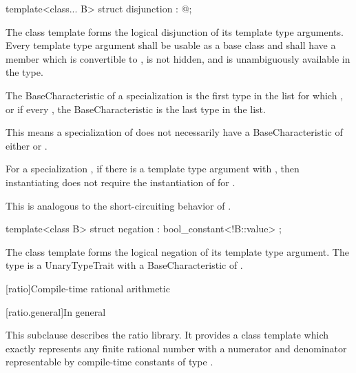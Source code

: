 %
\begin{itemdecl}
template<class... B> struct disjunction : @\seebelow@ { };
\end{itemdecl}

\begin{itemdescr}
\pnum
The class template 
forms the logical disjunction of its template type arguments.
Every template type argument shall be usable as a base class and
shall have a member  which
is convertible to ,
is not hidden, and
is unambiguously available in the type.

\pnum
The BaseCharacteristic of a specialization 
is the first type  in the list 
for which , or
if every ,
the BaseCharacteristic is the last type in the list.
\begin{note} This means a specialization of 
does not necessarily have a BaseCharacteristic
of either  or .
\end{note}

\pnum
For a specialization ,
if there is a template type argument  with ,
then instantiating 
does not require the instantiation of  for .
\begin{note} This is analogous to the short-circuiting behavior of \tcode{||}.
\end{note}
\end{itemdescr}

%
\begin{itemdecl}
template<class B> struct negation : bool_constant<!B::value> { };
\end{itemdecl}

\begin{itemdescr}
\pnum
The class template 
forms the logical negation of its template type argument.
The type 
is a UnaryTypeTrait with a BaseCharacteristic of .
\end{itemdescr}

[ratio]{Compile-time rational arithmetic}

[ratio.general]{In general}

\pnum
{}%
This subclause describes the ratio library. It provides a class template
 which exactly represents any finite rational number with a
numerator and denominator representable by compile-time constants of type
.

